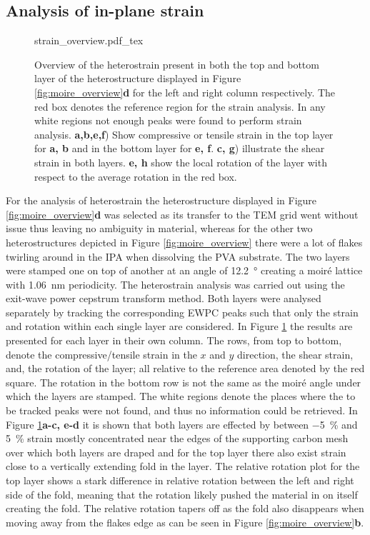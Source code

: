 \subsection{Analysis of in-plane strain}
\begin{figure}
    \centering
    \def\svgwidth{.74\linewidth}
    {strain_overview.pdf_tex}
    \caption{Overview of the heterostrain present in both the top and bottom layer of the heterostructure displayed in Figure \ref{fig:moire_overview}\textbf{d} for the left and right column respectively. The red box denotes the reference region for the strain analysis. In any white regions not enough peaks were found to perform strain analysis. \textbf{a,b,e,f}) Show compressive or tensile strain in the top layer for \textbf{a, b} and in the bottom layer for \textbf{e, f}. \textbf{c, g}) illustrate the shear strain in both layers. \textbf{e, h} show the local rotation of the layer with respect to the average rotation in the red box.}
    \label{fig:strain_overview}
\end{figure}

For the analysis of heterostrain the heterostructure displayed in Figure \ref{fig:moire_overview}\textbf{d} was selected as its transfer to the TEM grid went without issue thus leaving no ambiguity in material, whereas for the other two heterostructures depicted in Figure \ref{fig:moire_overview} there were a lot of flakes twirling around in the IPA when dissolving the PVA substrate. The two layers were stamped one on top of another at an angle of \SI{12.2}{\degree} creating a moiré lattice with \SI{1.06}{\nano\meter} periodicity.
The heterostrain analysis was carried out using the exit-wave power cepstrum transform method. Both layers were analysed separately by tracking the corresponding EWPC peaks such that only the strain and rotation within each single layer are considered. In Figure \ref{fig:strain_overview} the results are presented for each layer in their own column. The rows, from top to bottom, denote the compressive/tensile strain in the $x$ and $y$ direction, the shear strain, and, the rotation of the layer; all relative to the reference area denoted by the red square. The rotation in the bottom row is not the same as the moiré angle under which the layers are stamped. The white regions denote the places where the to be tracked peaks were not found, and thus no information could be retrieved.
In Figure \ref{fig:strain_overview}\textbf{a-c, e-d} it is shown that both layers are effected by between \SI{-5}{\percent} and \SI{5}{\percent} strain mostly concentrated near the edges of the supporting carbon mesh over which both layers are draped and for the top layer there also exist strain close to a vertically extending fold in the layer. The relative rotation plot for the top layer shows a stark difference in relative rotation between the left and right side of the fold, meaning that the rotation likely pushed the material in on itself creating the fold. The relative rotation tapers off as the fold also disappears when moving away from the flakes edge as can be seen in Figure \ref{fig:moire_overview}\textbf{b}.\\
\newpage

